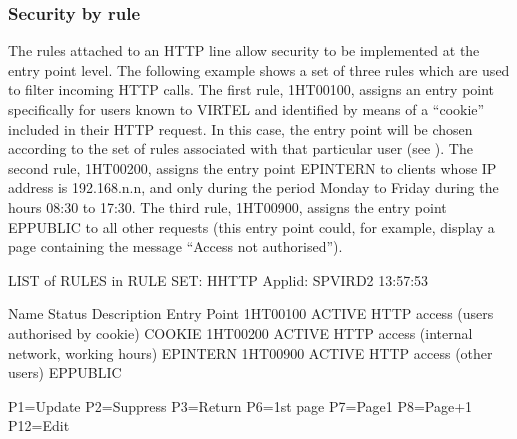 \documentclass[letterpaper,10pt,english]{sphinxmanual}
\begin{document}


\subsubsection{Security by rule}
\label{\detokenize{User_Guide:security-by-rule}}
The rules attached to an HTTP line allow security to be implemented at the entry point level. The following example
shows a set of three rules which are used to filter incoming HTTP calls. The first rule, 1HT00100, assigns an entry point
specifically for users known to VIRTEL and identified by means of a “cookie” included in their HTTP request. In this
case, the entry point will be chosen according to the set of rules associated with that particular user (see
{\hyperref[\detokenize{User_Guide:v457ug-correspondent-management}]{}}). The second rule, 1HT00200, assigns the entry point EPINTERN to clients
whose IP address is 192.168.n.n, and only during the period Monday to Friday during the hours 08:30 to 17:30. The
third rule, 1HT00900, assigns the entry point EPPUBLIC to all other requests (this entry point could, for example,
display a page containing the message “Access not authorised”).

\begin{sphinxVerbatim}[commandchars=\\\{\}]
LIST of RULES in RULE SET: H\PYGZhy{}HTTP \PYGZhy{}\PYGZhy{}\PYGZhy{}\PYGZhy{}\PYGZhy{}\PYGZhy{}\PYGZhy{}\PYGZhy{}\PYGZhy{}\PYGZhy{}\PYGZhy{}\PYGZhy{}\PYGZhy{}\PYGZhy{}\PYGZhy{}\PYGZhy{} Applid: SPVIRD2 13:57:53

Name     Status   Description                                    Entry Point
1HT00100 ACTIVE   HTTP access (users authorised by cookie)       \PYGZdl{}COOKIE\PYGZdl{}
1HT00200 ACTIVE   HTTP access (internal network, working hours)  EPINTERN
1HT00900 ACTIVE   HTTP access (other users)                      EPPUBLIC











P1=Update          P2=Suppress                 P3=Return
P6=1st page        P7=Page\PYGZhy{}1                   P8=Page+1             P12=Edit
\end{sphinxVerbatim}

\end{document}
